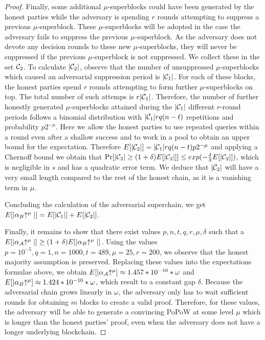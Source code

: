 \begin{proof}
Finally, some additional $\mu$-superblocks could have been generated by the
honest parties while the adversary is spending $r$ rounds attempting to suppress
a previous $\mu$-superblock. These $\mu$-superblocks will be adopted in the case
the adversary fails to suppress the previous $\mu$-superblock. As the adversary
does not devote any decision rounds to these new $\mu$-superblocks, they will
never be suppressed if the previous $\mu$-superblock is not suppressed. We
collect these in the set $\mathcal{C}_2$. To calculate $|\mathcal{C}_2|$, observe that the
number of unsuppressed $\mu$-superblocks which caused an adversarial suppression
period is $|\mathcal{C}_1|$. For each of these blocks, the honest parties spend $r$
rounds attempting to form further $\mu$-superblocks on top. The total number of
such attemps is $r|\mathcal{C}_1|$. Therefore, the number of further honestly
generated $\mu$-superblocks attained during the $|\mathcal{C}_1|$ different $r$-round
periods follows a binomial distribution with $|\mathcal{C}_1|rq(n - t)$ repetitions
and probability $p2^{-\mu}$. Here we allow the honest parties to use repeated
queries within a round even after a shallow success and to work in a pool
to obtain an upper bound for the expectation. Therefore $E[|\mathcal{C}_2|] =
|\mathcal{C}_1|rq(n - t)p2^{-\mu}$ and applying a Chernoff bound we obtain that
$\Pr[|\mathcal{C}_2| \geq (1 + \delta)E[|\mathcal{C}_2|]] \leq
exp(-\frac{\delta}{3}E[|\mathcal{C}_2|])$, which is negligible in $s$ and has a
quadratic error term. We deduce that $|\mathcal{C}_2|$ will have a very small length
compared to the rest of the honest chain, as it is a vanishing term in $\mu$.

Concluding the calculation of the adversarial superchain, we get
$E[|\alpha_B\negthickspace\uparrow^\mu|] = E[|\mathcal{C}_1|] + E[|\mathcal{C}_2|]$.

Finally, it remains to show that there exist values $p, n, t, q, r, \mu, \delta$
such that a $E[|\alpha_\mathcal{A}\negthickspace\uparrow^\mu|] \geq (1 +
\delta)E[|\alpha_B\negthickspace\uparrow^\mu|]$.
Using the values $p = 10^{-5}, q = 1, n =
1000, t = 489, \mu = 25, r = 200$, we observe that the honest majority
assumption is preserved. Replacing these values into the expectations formulae
above, we obtain $E[|\alpha_\mathcal{A}\negthickspace\uparrow^\mu] \approx 1.457 * 10^{-10} *
\omega$ and $E[|\alpha_B\negthickspace\uparrow^\mu] \approx 1.424 * 10^{-10} * \omega$, which
result to a constant gap $\delta$. Because the adversarial chain grows linearly
in $\omega$, the adversary only has to wait sufficient rounds for obtaining $m$
blocks to create a valid proof. Therefore, for these values, the adversary
will be able to generate a convincing PoPoW at some level $\mu$ which is longer
than the honest parties' proof, even when the adversary does not have a longer
underlying blockchain.
\Qed
\end{proof}
